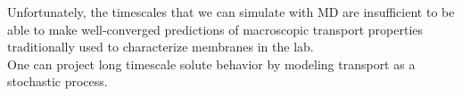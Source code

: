 \documentclass{article}
\begin{document}

  Unfortunately, the timescales that we can simulate with MD are insufficient to be
  able to make well-converged predictions of macroscopic transport properties 
  traditionally used to characterize membranes in the lab. \\

  One can project long timescale solute behavior by modeling transport as a
  stochastic process.
\end{document}
